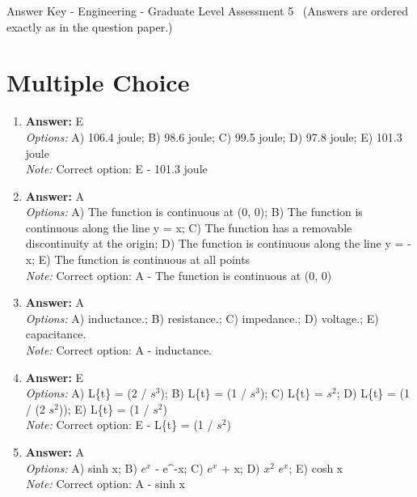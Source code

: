 \documentclass[12pt]{article}
\begin{document}
\begin{center}
Answer Key - Engineering - Graduate Level Assessment 5 \
\small (Answers are ordered exactly as in the question paper.)
\end{center}

\section*{Multiple Choice}
\begin{enumerate}[label=\arabic*.]
\item \textbf{Answer:} E
\\ \textit{Options:} A) 106.4 joule; B) 98.6 joule; C) 99.5 joule; D) 97.8 joule; E) 101.3 joule
\\ \textit{Note:} Correct option: E - 101.3 joule
\item \textbf{Answer:} A
\\ \textit{Options:} A) The function is continuous at (0, 0); B) The function is continuous along the line y = x; C) The function has a removable discontinuity at the origin; D) The function is continuous along the line y = -x; E) The function is continuous at all points
\\ \textit{Note:} Correct option: A - The function is continuous at (0, 0)
\item \textbf{Answer:} A
\\ \textit{Options:} A) inductance.; B) resistance.; C) impedance.; D) voltage.; E) capacitance.
\\ \textit{Note:} Correct option: A - inductance.
\item \textbf{Answer:} E
\\ \textit{Options:} A) L\{t\} = (2 / $s^3$); B) L\{t\} = (1 / $s^3$); C) L\{t\} = $s^2$; D) L\{t\} = (1 / (2 $s^2$)); E) L\{t\} = (1 / $s^2$)
\\ \textit{Note:} Correct option: E - L\{t\} = (1 / $s^2$)
\item \textbf{Answer:} A
\\ \textit{Options:} A) sinh x; B) $e^x$ - e^-x; C) $e^x$ + x; D) $x^2$ $e^x$; E) cosh x
\\ \textit{Note:} Correct option: A - sinh x
\end{enumerate}
\end{document}
